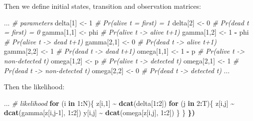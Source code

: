 \documentclass[
  12pt,
]{krantz}
\newenvironment{Shaded}{\begin{snugshade}}{\end{snugshade}}
\newcommand{\CommentTok}[1]{\textcolor[rgb]{0.56,0.35,0.01}{\textit{#1}}}
\newcommand{\ControlFlowTok}[1]{\textcolor[rgb]{0.13,0.29,0.53}{\textbf{#1}}}
\newcommand{\DecValTok}[1]{\textcolor[rgb]{0.00,0.00,0.81}{#1}}
\newcommand{\ErrorTok}[1]{\textcolor[rgb]{0.64,0.00,0.00}{\textbf{#1}}}
\newcommand{\FunctionTok}[1]{\textcolor[rgb]{0.13,0.29,0.53}{\textbf{#1}}}
\newcommand{\NormalTok}[1]{#1}
\newcommand{\OtherTok}[1]{\textcolor[rgb]{0.56,0.35,0.01}{#1}}
\newcommand{\SpecialCharTok}[1]{\textcolor[rgb]{0.81,0.36,0.00}{\textbf{#1}}}
\begin{document}
Then we define initial states, transition and observation matrices:

\begin{Shaded}
\begin{Highlighting}[]
\NormalTok{...}
  \CommentTok{\# parameters}
\NormalTok{  delta[}\DecValTok{1}\NormalTok{] }\OtherTok{\textless{}{-}} \DecValTok{1}          \CommentTok{\# Pr(alive t = first) = 1}
\NormalTok{  delta[}\DecValTok{2}\NormalTok{] }\OtherTok{\textless{}{-}} \DecValTok{0}          \CommentTok{\# Pr(dead t = first) = 0}
\NormalTok{  gamma[}\DecValTok{1}\NormalTok{,}\DecValTok{1}\NormalTok{] }\OtherTok{\textless{}{-}}\NormalTok{ phi      }\CommentTok{\# Pr(alive t {-}\textgreater{} alive t+1)}
\NormalTok{  gamma[}\DecValTok{1}\NormalTok{,}\DecValTok{2}\NormalTok{] }\OtherTok{\textless{}{-}} \DecValTok{1} \SpecialCharTok{{-}}\NormalTok{ phi  }\CommentTok{\# Pr(alive t {-}\textgreater{} dead t+1)}
\NormalTok{  gamma[}\DecValTok{2}\NormalTok{,}\DecValTok{1}\NormalTok{] }\OtherTok{\textless{}{-}} \DecValTok{0}        \CommentTok{\# Pr(dead t {-}\textgreater{} alive t+1)}
\NormalTok{  gamma[}\DecValTok{2}\NormalTok{,}\DecValTok{2}\NormalTok{] }\OtherTok{\textless{}{-}} \DecValTok{1}        \CommentTok{\# Pr(dead t {-}\textgreater{} dead t+1)}
\NormalTok{  omega[}\DecValTok{1}\NormalTok{,}\DecValTok{1}\NormalTok{] }\OtherTok{\textless{}{-}} \DecValTok{1} \SpecialCharTok{{-}}\NormalTok{ p    }\CommentTok{\# Pr(alive t {-}\textgreater{} non{-}detected t)}
\NormalTok{  omega[}\DecValTok{1}\NormalTok{,}\DecValTok{2}\NormalTok{] }\OtherTok{\textless{}{-}}\NormalTok{ p        }\CommentTok{\# Pr(alive t {-}\textgreater{} detected t)}
\NormalTok{  omega[}\DecValTok{2}\NormalTok{,}\DecValTok{1}\NormalTok{] }\OtherTok{\textless{}{-}} \DecValTok{1}        \CommentTok{\# Pr(dead t {-}\textgreater{} non{-}detected t)}
\NormalTok{  omega[}\DecValTok{2}\NormalTok{,}\DecValTok{2}\NormalTok{] }\OtherTok{\textless{}{-}} \DecValTok{0}        \CommentTok{\# Pr(dead t {-}\textgreater{} detected t)}
\NormalTok{...}
\end{Highlighting}
\end{Shaded}

Then the likelihood:

\begin{Shaded}
\begin{Highlighting}[]
\NormalTok{...}
    \CommentTok{\# likelihood}
    \ControlFlowTok{for}\NormalTok{ (i }\ControlFlowTok{in} \DecValTok{1}\SpecialCharTok{:}\NormalTok{N)\{}
\NormalTok{    z[i,}\DecValTok{1}\NormalTok{] }\SpecialCharTok{\textasciitilde{}} \FunctionTok{dcat}\NormalTok{(delta[}\DecValTok{1}\SpecialCharTok{:}\DecValTok{2}\NormalTok{])}
    \ControlFlowTok{for}\NormalTok{ (j }\ControlFlowTok{in} \DecValTok{2}\SpecialCharTok{:}\NormalTok{T)\{}
\NormalTok{      z[i,j] }\SpecialCharTok{\textasciitilde{}} \FunctionTok{dcat}\NormalTok{(gamma[z[i,j}\DecValTok{{-}1}\NormalTok{], }\DecValTok{1}\SpecialCharTok{:}\DecValTok{2}\NormalTok{])}
\NormalTok{      y[i,j] }\SpecialCharTok{\textasciitilde{}} \FunctionTok{dcat}\NormalTok{(omega[z[i,j], }\DecValTok{1}\SpecialCharTok{:}\DecValTok{2}\NormalTok{])}
\NormalTok{    \}}
\NormalTok{  \}}
\ErrorTok{\})}
\end{Highlighting}
\end{Shaded}
\end{document}
